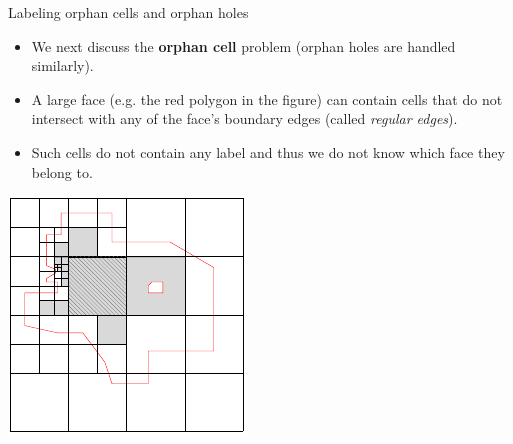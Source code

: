 \documentclass{beamer}
\begin{document}
    \begin{frame}{Labeling orphan cells and orphan holes}
        \begin{minipage}{0.59\textwidth}
            \begin{itemize}
                \item We next discuss the \textbf{orphan cell} problem (orphan holes are handled similarly).   
                \item A large face (e.g. the red polygon in the figure) can contain cells that do not intersect with any of the face's boundary edges (called \textit{regular edges}).
                \item Such cells do not contain any label and thus we do not know which face they belong to.
            \end{itemize}
        \end{minipage}\hfill %
        \begin{minipage}{0.4\textwidth}
            \centering
            \includegraphics[width=\textwidth]{figures/holes1}
            \end{minipage}
    \end{frame}
    
\end{document}
